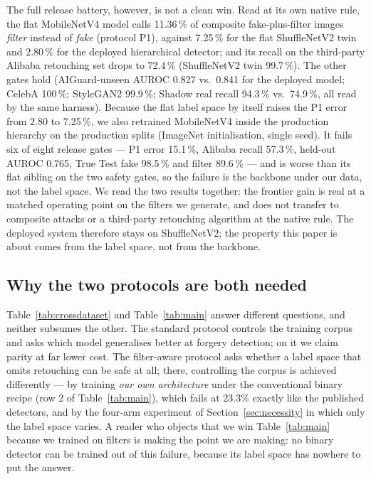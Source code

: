 \documentclass[conference]{IEEEtran}
\begin{document}
The full release battery, however, is not a clean win. Read at its own native rule, the
flat MobileNetV4 model calls 11.36\,\% of composite fake-plus-filter images \emph{filter}
instead of \emph{fake} (protocol P1), against 7.25\,\% for the flat ShuffleNetV2 twin and
2.80\,\% for the deployed hierarchical detector; and its recall on the third-party Alibaba
retouching set drops to 72.4\,\% (ShuffleNetV2 twin 99.7\,\%). The other gates hold
(AIGuard-unseen AUROC 0.827 vs.\ 0.841 for the deployed model; CelebA 100\,\%; StyleGAN2
99.9\,\%; Shadow real recall 94.3\,\% vs.\ 74.9\,\%, all read by the same harness). Because the flat label space by itself raises the P1 error from 2.80
to 7.25\,\%, we also retrained MobileNetV4 inside the production hierarchy on the production
splits (ImageNet initialisation, single seed). It fails six of eight release gates --- P1 error
15.1\,\%, Alibaba recall 57.3\,\%, held-out AUROC 0.765, True Test fake 98.5\,\% and filter
89.6\,\% --- and is worse than its flat sibling on the two safety gates, so the failure is the
backbone under our data, not the label space. We read the two results together: the frontier
gain is real at a matched operating point on the filters we generate, and does not transfer
to composite attacks or a third-party retouching algorithm at the native rule. The deployed
system therefore stays on ShuffleNetV2; the property this paper is about comes from the label
space, not from the backbone.

\subsection{Why the two protocols are both needed}
Table~\ref{tab:crossdataset} and Table~\ref{tab:main} answer different questions, and neither
subsumes the other. The standard protocol controls the training corpus and asks which model
generalises better at forgery detection; on it we claim parity at far lower cost. The
filter-aware protocol asks whether a label space that omits retouching can be safe at all;
there, controlling the corpus is achieved differently --- by training \emph{our own architecture}
under the conventional binary recipe (row 2 of Table~\ref{tab:main}), which fails at 23.3\%
exactly like the published detectors, and by the four-arm experiment of
Section~\ref{sec:necessity} in which only the label space varies. A reader who objects that we
win Table~\ref{tab:main} because we trained on filters is making the point we are making: no
binary detector can be trained out of this failure, because its label space has nowhere to put
the answer.
\end{document}
